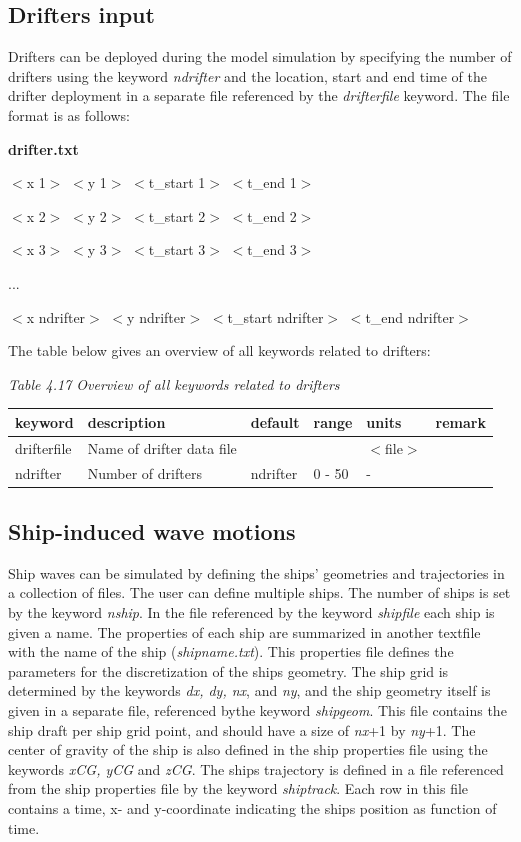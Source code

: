 \documentclass{article}
\begin{document}
\subsection{ Drifters input}

\noindent Drifters can be deployed during the model simulation by specifying the number of drifters using the keyword \textit{ndrifter} and the location, start and end time of the drifter deployment in a separate file referenced by the \textit{drifterfile} keyword. The file format is as follows:

\noindent \textbf{drifter.txt}

\noindent $<$x 1$>$ $<$y 1$>$ $<$t\_start 1$>$ $<$t\_end 1$>$

\noindent $<$x 2$>$ $<$y 2$>$ $<$t\_start 2$>$ $<$t\_end 2$>$

\noindent $<$x 3$>$ $<$y 3$>$ $<$t\_start 3$>$ $<$t\_end 3$>$

\noindent ...

\noindent $<$x ndrifter$>$ $<$y ndrifter$>$ $<$t\_start ndrifter$>$ $<$t\_end ndrifter$>$

\noindent The table below gives an overview of all keywords related to drifters:

\noindent \textit{Table 4.17 Overview of all keywords related to drifters}

\begin{tabular}{|p{0.8in}|p{1.0in}|p{0.8in}|p{0.6in}|p{0.5in}|p{0.6in}|} \hline 
keyword & description\textbf{} & default & range & units & remark \\ \hline 
drifterfile & Name of drifter data file &  &  & $<$file$>$ &  \\ \hline 
ndrifter & Number of drifters & ndrifter & 0 - 50 & - &  \\ \hline 
\end{tabular}


\subsection{ Ship-induced wave motions}

\noindent Ship waves can be simulated by defining the ships' geometries and trajectories in a collection of files. The user can define multiple ships. The number of ships is set by the keyword \textit{nship}. In the file referenced by the keyword \textit{shipfile} each ship is given a name. The properties of each ship are summarized in another textfile with the name of the ship (\textit{shipname.txt}). This properties file defines the parameters for the discretization of the ships geometry. The ship grid is determined by the keywords \textit{dx, dy, nx}, and \textit{ny}, and the ship geometry itself is given in a separate file, referenced bythe keyword \textit{shipgeom}. This file contains the ship draft per ship grid point, and should have a size of \textit{nx}+1 by \textit{ny}+1. The center of gravity of the ship is also defined in the ship properties file using the keywords \textit{xCG, yCG} and \textit{zCG}. The ships trajectory is defined in a file referenced from the ship properties file by the keyword\textit{ shiptrack}. Each row in this file contains a time, x- and y-coordinate indicating the ships  position as function of time.  
\end{document}
